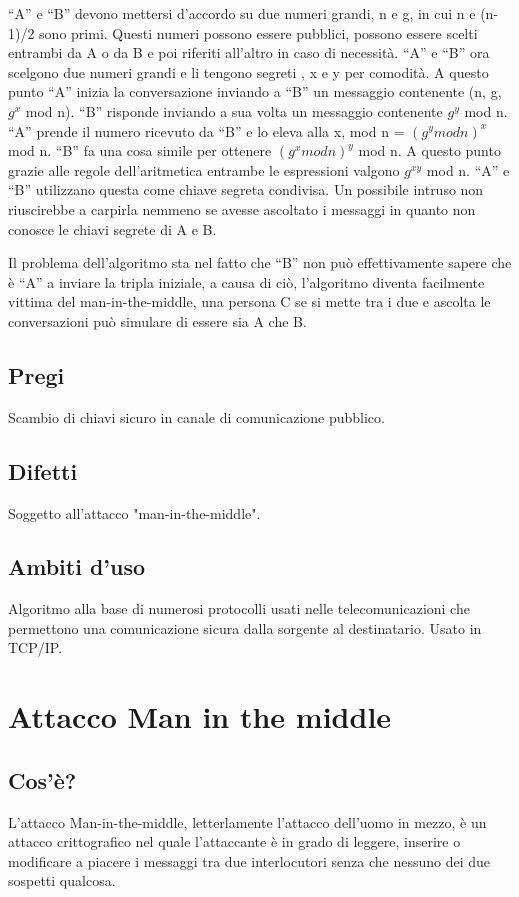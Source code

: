 “A” e “B” devono mettersi d’accordo su due numeri grandi, n e g, in cui n e (n-1)/2 sono primi.
Questi numeri possono essere pubblici, possono essere scelti entrambi da A o da B e poi riferiti all’altro in caso di necessità.
“A” e “B” ora scelgono due numeri grandi e li tengono segreti , x e y per comodità.
A questo punto “A” inizia la conversazione inviando a “B” un messaggio contenente (n, g, $g^x$ mod n).
“B” risponde inviando a sua volta un messaggio contenente $g^y$ mod n. 
“A” prende il numero ricevuto da “B” e lo eleva alla x, mod n = $(g^y mod n)^x$ mod n. “B” fa una cosa simile per ottenere $(g^x mod n)^y$ mod n.
A questo punto grazie alle regole dell’aritmetica entrambe le espressioni valgono $g^{xy}$ mod n. “A” e “B” utilizzano questa come chiave segreta condivisa.
Un possibile intruso non riuscirebbe a carpirla nemmeno se avesse ascoltato i messaggi in quanto non conosce le chiavi segrete di A e B.

Il problema dell’algoritmo sta nel fatto che “B” non può effettivamente sapere che è “A” a inviare la tripla iniziale, a causa di ciò, l’algoritmo diventa facilmente vittima del man-in-the-middle, una persona C se si mette tra i due e ascolta le conversazioni può simulare di essere sia A che B.
\subsection{Pregi}
Scambio di chiavi sicuro in canale di comunicazione pubblico.
\subsection{Difetti}
Soggetto all'attacco "man-in-the-middle".
\subsection{Ambiti d'uso}
Algoritmo alla base di numerosi protocolli usati nelle telecomunicazioni che permettono una comunicazione sicura dalla sorgente al destinatario. Usato in TCP/IP.

\section{Attacco Man in the middle}
\subsection{Cos'è?}
L’attacco Man-in-the-middle, letterlamente l’attacco dell’uomo in mezzo, è un attacco crittografico nel quale l’attaccante è in grado di leggere, inserire o modificare a piacere i messaggi tra due interlocutori senza che nessuno dei due sospetti qualcosa.

